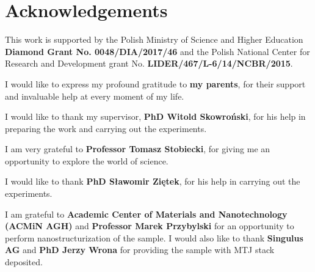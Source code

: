 \chapter{Acknowledgements}

	This work is supported by the Polish Ministry of Science and Higher Education \textbf{Diamond Grant No. 0048/DIA/2017/46} and the Polish National Center for Research and Development grant No. \textbf{LIDER/467/L-6/14/NCBR/2015}.
	
    \vspace{2cm}
    
    I would like to express my profound gratitude to \textbf{my parents}, for their support and invaluable help at every moment of my life.

    I would like to thank my supervisor, \textbf{PhD Witold Skowroński}, for his help in preparing the work and carrying out the experiments.

	I am very grateful to \textbf{Professor Tomasz Stobiecki}, for giving me an opportunity to explore the world of science.

    I would like to thank \textbf{PhD Sławomir Ziętek}, for his help in carrying out the experiments.
    
    I am grateful to \textbf{Academic Center of Materials and Nanotechnology (ACMiN AGH)} and \textbf{Professor Marek Przybylski} for an opportunity to perform nanostructurization of the sample. I would also like to thank \textbf{Singulus AG} and \textbf{PhD Jerzy Wrona} for providing the sample with MTJ stack deposited.
